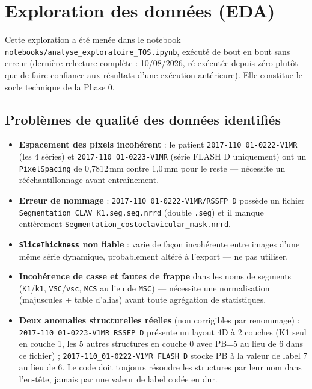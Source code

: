 \chapter{Exploration des données (EDA)}
\label{chap:exploration}

Cette exploration a été menée dans le notebook \texttt{notebooks/analyse\_exploratoire\_TOS.ipynb},
exécuté de bout en bout sans erreur (dernière relecture complète : 10/08/2026, ré-exécutée depuis zéro
plutôt que de faire confiance aux résultats d'une exécution antérieure). Elle constitue le socle
technique de la Phase 0.

\section{Problèmes de qualité des données identifiés}

\begin{itemize}
    \item \textbf{Espacement des pixels incohérent} : le patient \texttt{2017-110\_01-0222-V1MR}
        (les 4 séries) et \texttt{2017-110\_01-0223-V1MR} (série FLASH D uniquement) ont un
        \texttt{PixelSpacing} de 0,7812\,mm contre 1,0\,mm pour le reste --- nécessite un
        rééchantillonnage avant entraînement.
    \item \textbf{Erreur de nommage} : \texttt{2017-110\_01-0222-V1MR/RSSFP D} possède un fichier
        \texttt{Segmentation\_CLAV\_K1.seg.seg.nrrd} (double \texttt{.seg}) et il manque entièrement
        \texttt{Segmentation\_costoclavicular\_mask.nrrd}.
    \item \textbf{\texttt{SliceThickness} non fiable} : varie de façon incohérente entre images d'une
        même série dynamique, probablement altéré à l'export --- ne pas utiliser.
    \item \textbf{Incohérence de casse et fautes de frappe} dans les noms de segments
        (\texttt{K1}/\texttt{k1}, \texttt{VSC}/\texttt{vsc}, \texttt{MCS} au lieu de \texttt{MSC}) ---
        nécessite une normalisation (majuscules + table d'alias) avant toute agrégation de
        statistiques.
    \item \textbf{Deux anomalies structurelles réelles} (non corrigibles par renommage) :
        \texttt{2017-110\_01-0223-V1MR RSSFP D} présente un layout 4D à 2 couches (K1 seul en couche 1,
        les 5 autres structures en couche 0 avec PB=5 au lieu de 6 dans ce fichier) ;
        \texttt{2017-110\_01-0222-V1MR FLASH D} stocke PB à la valeur de label 7 au lieu de 6. Le code
        doit toujours résoudre les structures par leur nom dans l'en-tête, jamais par une valeur de
        label codée en dur.
\end{itemize}

